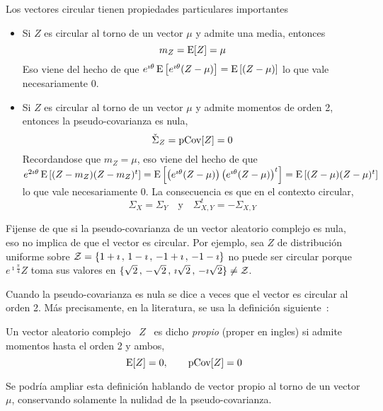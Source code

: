 Los vectores circular tienen propiedades particulares importantes
%
\begin{itemize}
\item  Si $Z$  es circular  al torno  de  un vector  $\mu$ y  admite una  media,
  entonces $$m_Z = \operatorname{E}[Z] = \mu$$ Eso viene del hecho de que $e^{\imath \theta}
  \operatorname{E}\left[ e^{\imath \theta} (Z - \mu) \right] = \operatorname{E}\left[ (Z - \mu) \right]$
  lo que vale necesariamente 0.
%
\item Si $Z$ es circular al torno  de un vector $\mu$ y admite momentos de orden
  2, entonces la pseudo-covarianza es  nula, $$\check{\Sigma}_Z = \operatorname{pCov}[Z] = 0$$
  Recordandose que $m_Z = \mu$, eso  viene del hecho de que $e^{2 \imath \theta}
  \operatorname{E}\left[ (Z - m_Z) (Z - m_Z)^t \right] = \operatorname{E}\left[ \left( e^{\imath \theta}
      (Z - \mu)  \right) \left( e^{\imath \theta} (Z -  \mu) \right)^t \right] =
  \operatorname{E}\left[ (Z  - \mu) (Z  - \mu)^t \right]$  lo que vale necesariamente  0. La
  consecuencia es que en el contexto circular, 
  \[
  \Sigma_X = \Sigma_Y \quad \mbox{y} \quad \Sigma_{X,Y}^t = - \Sigma_{X,Y}
  \]
\end{itemize}

Fijense de que si la pseudo-covarianza  de un vector aleatorio complejo es nula,
eso  no  implica  de  que  el  vector  es circular.  Por  ejemplo,  sea  $Z$  de
distribuci\'on  uniforme sobre  $\mathcal{Z}  = \{  1+\imath \,  ,  \, 1-\imath  \, ,  \,
-1+\imath  \,  ,  \, -1-\imath  \}$  no  puede  ser circular  porque  $e^{\imath
  \frac{\pi}{4}} Z$  toma sus  valores en  $\{ \sqrt2 \,  , \,  -\sqrt2 \,  , \,
\imath \sqrt2 \, , \, -\imath \sqrt2 \} \ne \mathcal{Z}$.

Cuando la pseudo-covarianza es nula se dice a veces que el vector es circular al
orden  2.  M\'as  precisamente,  en   la  literatura,  se  usa  la  definici\'on
siguiente~\cite[Def.~17.4.1]{Lap17}:
%
\begin{definicion}\label{Def:MP:VectorAleatorioComplejoPropio}
%
  Un vector aleatorio complejo \ $Z$  \ es dicho {\em propio} (proper en ingles)
  si admite momentos hasta el orden 2 y ambos,
  \[
  \operatorname{E}[Z] = 0, \qquad \operatorname{pCov}[Z] = 0
  \]
\end{definicion}
%
Se podr\'ia ampliar  esta definici\'on hablando de vector propio  al torno de un
vector $\mu$, conservando solamente la nulidad de la pseudo-covarianza.




